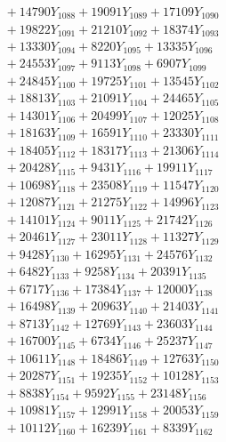 \documentclass[a4paper,10pt]{article}
\begin{document}
{\begin{align}
&\;  + 14790 Y_{1088} + 19091 Y_{1089} + 17109 Y_{1090} \\[0.3ex]
&\;  + 19822 Y_{1091} + 21210 Y_{1092} + 18374 Y_{1093} \\[0.3ex]
&\;  + 13330 Y_{1094} + 8220 Y_{1095} + 13335 Y_{1096} \\[0.3ex]
&\;  + 24553 Y_{1097} + 9113 Y_{1098} + 6907 Y_{1099} \\[0.3ex]
&\;  + 24845 Y_{1100} + 19725 Y_{1101} + 13545 Y_{1102} \\[0.3ex]
&\;  + 18813 Y_{1103} + 21091 Y_{1104} + 24465 Y_{1105} \\[0.3ex]
&\;  + 14301 Y_{1106} + 20499 Y_{1107} + 12025 Y_{1108} \\[0.5ex]\allowbreak
&\;  + 18163 Y_{1109} + 16591 Y_{1110} + 23330 Y_{1111} \\[0.3ex]
&\;  + 18405 Y_{1112} + 18317 Y_{1113} + 21306 Y_{1114} \\[0.3ex]
&\;  + 20428 Y_{1115} + 9431 Y_{1116} + 19911 Y_{1117} \\[0.3ex]
&\;  + 10698 Y_{1118} + 23508 Y_{1119} + 11547 Y_{1120} \\[0.3ex]
&\;  + 12087 Y_{1121} + 21275 Y_{1122} + 14996 Y_{1123} \\[0.3ex]
&\;  + 14101 Y_{1124} + 9011 Y_{1125} + 21742 Y_{1126} \\[0.3ex]
&\;  + 20461 Y_{1127} + 23011 Y_{1128} + 11327 Y_{1129} \\[0.3ex]
&\;  + 9428 Y_{1130} + 16295 Y_{1131} + 24576 Y_{1132} \\[0.3ex]
&\;  + 6482 Y_{1133} + 9258 Y_{1134} + 20391 Y_{1135} \\[0.3ex]
&\;  + 6717 Y_{1136} + 17384 Y_{1137} + 12000 Y_{1138} \\[0.5ex]\allowbreak
&\;  + 16498 Y_{1139} + 20963 Y_{1140} + 21403 Y_{1141} \\[0.3ex]
&\;  + 8713 Y_{1142} + 12769 Y_{1143} + 23603 Y_{1144} \\[0.3ex]
&\;  + 16700 Y_{1145} + 6734 Y_{1146} + 25237 Y_{1147} \\[0.3ex]
&\;  + 10611 Y_{1148} + 18486 Y_{1149} + 12763 Y_{1150} \\[0.3ex]
&\;  + 20287 Y_{1151} + 19235 Y_{1152} + 10128 Y_{1153} \\[0.3ex]
&\;  + 8838 Y_{1154} + 9592 Y_{1155} + 23148 Y_{1156} \\[0.3ex]
&\;  + 10981 Y_{1157} + 12991 Y_{1158} + 20053 Y_{1159} \\[0.3ex]
&\;  + 10112 Y_{1160} + 16239 Y_{1161} + 8339 Y_{1162} \\[0.3ex]

\end{align}}
\end{document}

